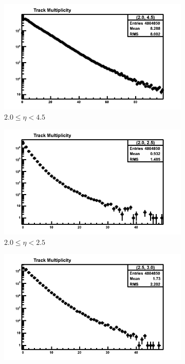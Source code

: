 \begin{figure}[h]
	\begin{subfigure}[h]{0.32\textwidth}
		\includegraphics[width=\textwidth]{./Chapters/multiplicity/images/reconstructed_multiplicity_2_0_4_5_real_down.png}
		\caption{$2.0 \le \eta < 4.5$}
		\label{fig: reconstructed track multiplicity measured down 2.0 - 4.5}
	\end{subfigure}
	\begin{subfigure}[h]{0.32\textwidth}
		\includegraphics[width=\textwidth]{./Chapters/multiplicity/images/reconstructed_multiplicity_2_0_2_5_real_down.png}
		\caption{$2.0 \le \eta < 2.5$}
		\label{fig: reconstructed track multiplicity measured down 2.0 - 2.5}
	\end{subfigure}
	\begin{subfigure}[h]{0.32\textwidth}
		\includegraphics[width=\textwidth]{./Chapters/multiplicity/images/reconstructed_multiplicity_2_5_3_0_real_down.png}

\end{subfigure}
\end{figure}
